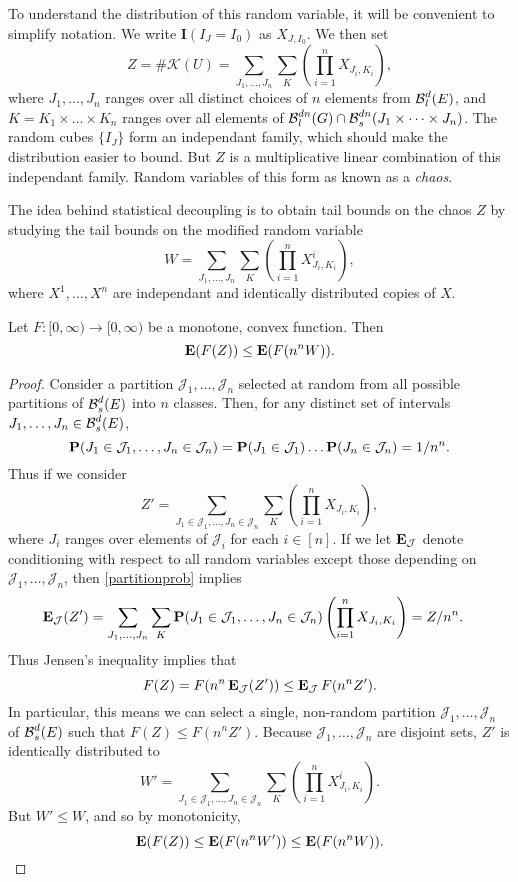 To understand the distribution of this random variable, it will be convenient to simplify notation. We write $\mathbf{I}(I_J = I_0)$ as $X_{J,I_0}$. We then set
%
\[ Z = \# \mathcal{K}(U) = \sum_{J_1, \dots, J_n} \sum_K \left( \prod_{i = 1}^n X_{J_i,K_i} \right), \]
%
where $J_1, \dots, J_n$ ranges over all distinct choices of $n$ elements from $\operatorname{\mathcal{B}}^d_l(E)$, and $K = K_1 \times \dots \times K_n$ ranges over all elements of $\operatorname{\mathcal{B}}^{dn}_l(G) \cap \operatorname{\mathcal{B}}^{dn}_s(J_1 \times \dots \times J_n)$. The random cubes $\{ I_J \}$ form an independant family, which should make the distribution easier to bound. But $Z$ is a multiplicative linear combination of this independant family. Random variables of this form as known as a \emph{chaos}.

The idea behind statistical decoupling is to obtain tail bounds on the chaos $Z$ by studying the tail bounds on the modified random variable
%
\[ W = \sum_{J_1, \dots, J_n} \sum_K \left( \prod_{i = 1}^n X_{J_i,K_i}^i \right), \]
%
where $X^1, \dots, X^n$ are independant and identically distributed copies of $X$.

\begin{lemma} \label{decouplinglemma}
	Let $F: [0,\infty) \to [0,\infty)$ be a monotone, convex function. Then
	\[ \operatorname{\mathbf{E}}(F(Z)) \leq \operatorname{\mathbf{E}}(F(n^n W)). \]
\end{lemma}
\begin{proof}
	Consider a partition $\mathcal{J}_1, \dots, \mathcal{J}_n$ selected at random from all possible partitions of $\operatorname{\mathcal{B}}^d_s(E)$ into $n$ classes. Then, for any distinct set of intervals $J_1, \dots, J_n \in \operatorname{\mathcal{B}}^d_s(E)$,
	\begin{equation} \label{partitionprob}
		\operatorname{\mathbf{P}}(J_1 \in \mathcal{J}_1, \dots, J_n \in \mathcal{J}_n) = \operatorname{\mathbf{P}}(J_1 \in \mathcal{J}_1) \dots \operatorname{\mathbf{P}}(J_n \in \mathcal{J}_n) = 1/n^n.
	\end{equation}
	Thus if we consider
	\[ Z' = \sum_{J_1 \in \mathcal{J}_1, \dots, J_n \in \mathcal{J}_n} \sum_K \left( \prod_{i = 1}^n X_{J_i,K_i} \right), \]
	where $J_i$ ranges over elements of $\mathcal{J}_i$ for each $i \in [n]$. If we let $\operatorname{\mathbf{E}}_{\mathcal{J}}$ denote conditioning with respect to all random variables except those depending on $\mathcal{J}_1, \dots, \mathcal{J}_n$, then \eqref{partitionprob} implies
	\begin{align*}
		\operatorname{\mathbf{E}}_{\mathcal{J}}(Z') &= \sum_{J_1, \dots, J_n} \sum_K \operatorname{\mathbf{P}}(J_1 \in \mathcal{J}_1, \dots, J_n \in \mathcal{J}_n) \left( \prod_{i = 1}^n X_{J_i,K_i} \right) = Z/n^n.
	\end{align*}
	Thus Jensen's inequality implies that
	\[ F(Z) = F(n^n \operatorname{\mathbf{E}}_{\mathcal{J}}(Z')) \leq \operatorname{\mathbf{E}}_{\mathcal{J}} F(n^n Z'). \]
	In particular, this means we can select a single, non-random partition $\mathcal{J}_1, \dots, \mathcal{J}_n$ of $\operatorname{\mathcal{B}}^d_s(E)$ such that $F(Z) \leq F(n^n Z')$. Because $\mathcal{J}_1, \dots, \mathcal{J}_n$ are disjoint sets, $Z'$ is identically distributed to
	\[ W' = \sum_{J_1 \in \mathcal{J}_1, \dots, J_n \in \mathcal{J}_n} \sum_K \left( \prod_{i = 1}^n X_{J_i,K_i}^i \right). \]
	But $W' \leq W$, and so by monotonicity,
	\[ \operatorname{\mathbf{E}}(F(Z)) \leq \operatorname{\mathbf{E}}(F(n^n W')) \leq \operatorname{\mathbf{E}}(F(n^n W)). \qedhere \]
\end{proof}

